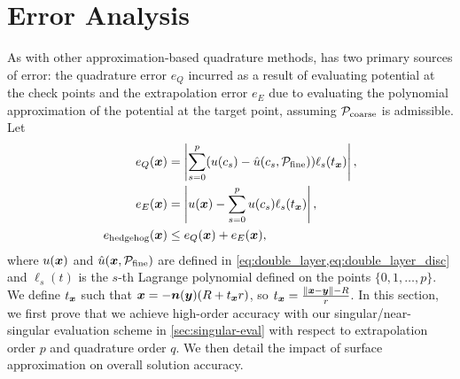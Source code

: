 \section{Error Analysis\label{sec:error}}
As with other approximation-based quadrature methods, \qbkix has two primary sources of error: the quadrature error $e_Q$ incurred as a result of evaluating potential at the check points and the extrapolation error $e_E$ due to evaluating the polynomial approximation of the potential at the target point, assuming ${\mathcal{P}_{\mathrm{coarse}}}$ is admissible. Let
\begin{align}
e_Q({\bm{x}}) &=\left|\sum_{s=0}^p (u(c_s) - \hat{u}(c_s,{\mathcal{P}_{\mathrm{fine}}}) )\ell_s(t_{\bm{x}})\right|,
  \label{eq:err-quad}\\
e_E({\bm{x}}) &= \left|u({\bm{x}}) - \sum_{s=0}^p u(c_s)\ell_s(t_{\bm{x}})\right|,
  \label{eq:err-ext} \\
e_{\mathrm{hedgehog}}({\bm{x}}) &\leq e_Q({\bm{x}}) + e_E({\bm{x}}),
  \label{eq:err-hedgehog} \\
\end{align}
where $u({\bm{x}})$ and $\hat{u}({\bm{x}}, {\mathcal{P}_{\mathrm{fine}}})$ are defined in \cref{eq:double_layer,eq:double_layer_disc} and $\ell_s(t)$ is the $s$-th Lagrange polynomial defined on the points $\{0,1,\hdots, p\}$.
We define $t_{\bm{x}}$ such that ${\bm{x}} = -{\bm{n}}({\bm{y}})(R + t_{\bm{x}} r)$, so $t_{\bm{x}} = \frac{\|{\bm{x}} - {\bm{y}}\| - R}{r}$. 
In this section, we first prove that we achieve high-order accuracy with our singular/near-singular evaluation scheme in \cref{sec:singular-eval} with respect to extrapolation order $p$ and quadrature order $q$.
We then detail the impact of surface approximation on overall solution accuracy.


